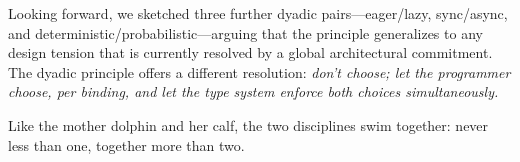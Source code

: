\documentclass[11pt,a4paper]{article}
\begin{document}
\begin{sloppypar}
Looking forward, we sketched three further dyadic pairs---eager/lazy, sync/async,
and deterministic/probabilistic---arguing that the principle generalizes to any
design tension that is currently resolved by a global architectural commitment.
The dyadic principle offers a different resolution: \emph{don't choose; let the
programmer choose, per binding, and let the type system enforce both choices
simultaneously.}
\end{sloppypar}

Like the mother dolphin and her calf, the two disciplines swim together: never
less than one, together more than two.


\end{document}
